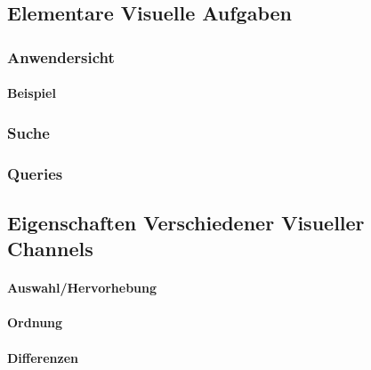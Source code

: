         \subsection{Elementare Visuelle Aufgaben} %

            \subsubsection{Anwendersicht} %

                \paragraph{Beispiel} %

            \subsubsection{Suche} %

            \subsubsection{Queries} %

        \subsection{Eigenschaften Verschiedener Visueller Channels} %

                \paragraph{Auswahl/Hervorhebung} %

                \paragraph{Ordnung} %

                \paragraph{Differenzen} %

